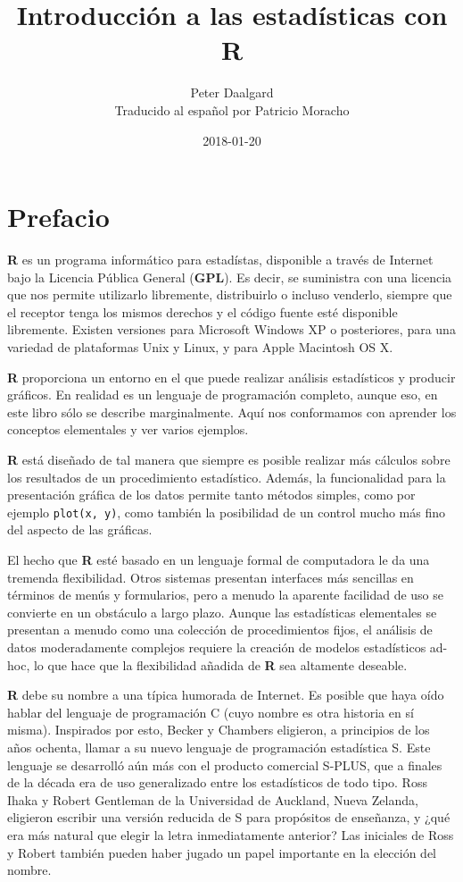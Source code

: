 \documentclass[spanish]{extbook}
\title{Introducción a las estadísticas con R}
\date{2018-01-20}
\author{Peter Daalgard\\\small{Traducido al español por Patricio Moracho}}
\numberwithin{equation}{section}
\numberwithin{figure}{section}
\begin{document}
\maketitle

\chapter*{Prefacio}

\textbf{R} es un programa informático para estadístas, disponible a través de
Internet bajo la Licencia Pública General (\textbf{GPL}). Es decir, se
suministra con una licencia que nos permite utilizarlo libremente, distribuirlo
o incluso venderlo, siempre que el receptor tenga los mismos derechos y el
código fuente esté disponible libremente. Existen versiones para Microsoft
Windows XP o posteriores, para una variedad de plataformas Unix y Linux, y para
Apple Macintosh OS X. 

\textbf{R} proporciona un entorno en el que puede realizar análisis
estadísticos y producir gráficos.  En realidad es un lenguaje de programación
completo, aunque eso, en este libro sólo se describe marginalmente. Aquí nos
conformamos con aprender los conceptos elementales y ver varios ejemplos. 

\textbf{R} está diseñado de tal manera que siempre es posible realizar más
cálculos sobre los resultados de un procedimiento estadístico. Además, la
funcionalidad para la presentación gráfica de los datos permite tanto métodos
simples, como por ejemplo \texttt{plot(x, y)}, como también la posibilidad de
un control mucho más fino del aspecto de las gráficas. 

El hecho que \textbf{R} esté basado en un lenguaje formal de computadora le da
una tremenda flexibilidad.  Otros sistemas presentan interfaces más sencillas
en términos de menús y formularios, pero a menudo la aparente facilidad de uso
se convierte en un obstáculo a largo plazo. Aunque las estadísticas elementales
se presentan a menudo como una colección de procedimientos fijos, el análisis
de datos moderadamente complejos requiere la creación de modelos estadísticos
ad-hoc, lo que hace que la flexibilidad añadida de \textbf{R} sea altamente
deseable.

\textbf{R} debe su nombre a una típica humorada de Internet. Es posible que
haya oído hablar del lenguaje de programación C (cuyo nombre es otra historia
en sí misma). Inspirados por esto, Becker y Chambers eligieron, a principios de
los años ochenta, llamar a su nuevo lenguaje de programación estadística S.
Este lenguaje se desarrolló aún más con el producto comercial S-PLUS, que a
finales de la década era de uso generalizado entre los estadísticos de todo
tipo. Ross Ihaka y Robert Gentleman de la Universidad de Auckland, Nueva
Zelanda, eligieron escribir una versión reducida de S para propósitos de
enseñanza, y ¿qué era más natural que elegir la letra inmediatamente anterior?
Las iniciales de Ross y Robert también pueden haber jugado un papel importante
en la elección del nombre.
\end{document}
